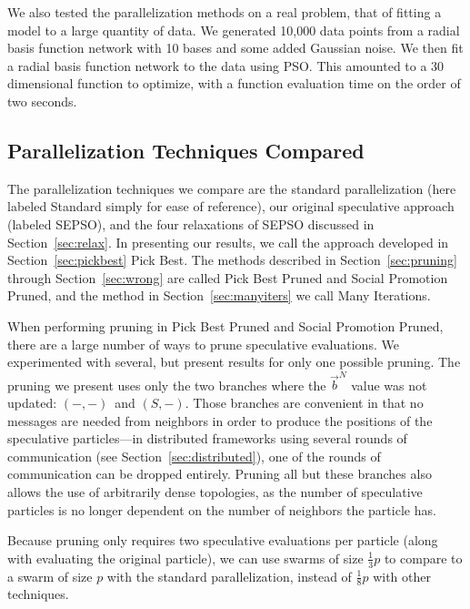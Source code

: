 \documentclass[smallcondensed]{svjour3}
\renewcommand{\sec}[1]{Section~\ref{sec:#1}}
\providecommand{\neigh}{\ensuremath{N}}
\providecommand{\nbest}{\ensuremath{\Vec{b}^\neigh}}
\providecommand{\casexn}{\ensuremath{(S,-)}}
\providecommand{\casepn}{\ensuremath{(-,-)}}
\begin{document}
We also tested the parallelization methods on a real problem, that of fitting a
model to a large quantity of data.  We generated 10,000 data points from a
radial basis function network with 10 bases and some added Gaussian noise.  We
then fit a radial basis function network to the data using PSO.  This amounted
to a 30 dimensional function to optimize, with a function evaluation time on
the order of two seconds.

\subsection{Parallelization Techniques Compared}

The parallelization techniques we compare are the standard parallelization
(here labeled Standard simply for ease of reference), our original speculative
approach (labeled SEPSO), and the four relaxations of SEPSO discussed in
\sec{relax}.  In presenting our results, we call the approach developed in
\sec{pickbest} Pick Best.  The methods described in \sec{pruning} through
\sec{wrong} are called Pick Best Pruned and Social Promotion Pruned, and the
method in \sec{manyiters} we call Many Iterations.

When performing pruning in Pick Best Pruned and Social Promotion Pruned, there
are a large number of ways to prune speculative evaluations.  We experimented
with several, but present results for only one possible pruning.  The pruning
we present uses only the two branches where the $\nbest$ value was not updated:
\casepn\ and \casexn.  Those branches are convenient in that no messages are
needed from neighbors in order to produce the positions of the speculative
particles---in distributed frameworks using several rounds of communication
(see \sec{distributed}), one of the rounds of communication can be dropped
entirely.  Pruning all but these branches also allows the use of arbitrarily
dense topologies, as the number of speculative particles is no longer dependent
on the number of neighbors the particle has.

Because pruning only requires two speculative evaluations per particle (along
with evaluating the original particle), we can use swarms of size
$\frac{1}{3}p$ to compare to a swarm of size $p$ with the standard
parallelization, instead of $\frac{1}{8}p$ with other techniques.
\end{document}
